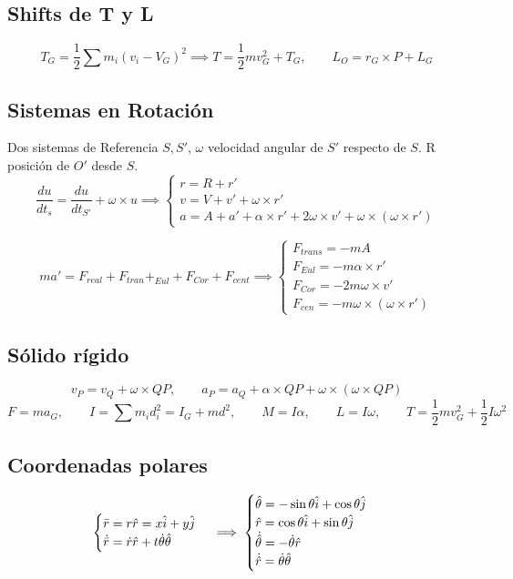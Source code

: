\documentclass{myclass}
\newcommand{\1}{\tikz[baseline=(char.base)]{
            \node[shape=circle,draw,inner sep=1pt] (char) {1};}}
\newcommand{\2}{\tikz[baseline=(char.base)]{
            \node[shape=circle,draw,inner sep=1pt] (char) {2};}}
\begin{document}
\subsection{Shifts de T y L}
$$
T_G = \frac{1}{2}\sum m_i(v_i-V_G)^2 \implies  T = \frac{1}{2}mv_G^2 + T_G, \qquad L_O = r_G\times P + L_G 
$$

\subsection{Sistemas en Rotación}
Dos sistemas de Referencia $S, S'$, $\omega$ velocidad angular de $S'$ respecto de $S$. R posición de $O'$ desde $S$.
$$
\frac{du}{dt_s} = \frac{du}{dt_{S'}} + \omega\times u \implies \begin{cases}
r = R + r'  \\
v = V + v' + \omega\times r'  \\
a = A + a' + \alpha\times r' + 2\omega\times v' + \omega\times(\omega\times r')
\end{cases}
$$

$$
ma' = F_{real} + F_{tran} + _{Eul} + F_{Cor} + F_{cent} \implies \begin{cases}
F_{trans} = -mA\\
F_{Eul} = -m\alpha\times r' \\
F_{Cor} = -2m\omega\times v'\\
F_{cen} = -m\omega\times (\omega\times r')
\end{cases}
$$

\subsection{Sólido rígido}
$$
v_P = v_Q + \omega\times QP, \qquad a_P = a_Q + \alpha \times QP + \omega\times(\omega\times QP)
$$
$$
F = ma_G, \qquad I = \sum m_id_i^2 = I_G + md^2, \qquad M = I\alpha, \qquad L = I\omega, \qquad T = \frac{1}{2}mv_G^2 + \frac{1}{2}I\omega^2
$$


\subsection{Coordenadas polares}
$$
\begin{cases}
\Bar{r} = r\hat{r} = x\hat{i} + y\hat{j} \\
\dot{\Bar{r}} = \dot r\hat{r} + t\dot\theta\hat{\theta}
\end{cases}
\implies 
\begin{cases}
\hat\theta = -\sin\theta \hat{i} + \cos\theta\hat{j} \\
\hat r = \cos\theta \hat{i} + \sin\theta\hat{j} \\
\dot{\hat\theta} = -\dot\theta \hat r \\
\dot{\hat r} = \dot\theta \hat\theta
\end{cases}
$$
\end{document}
